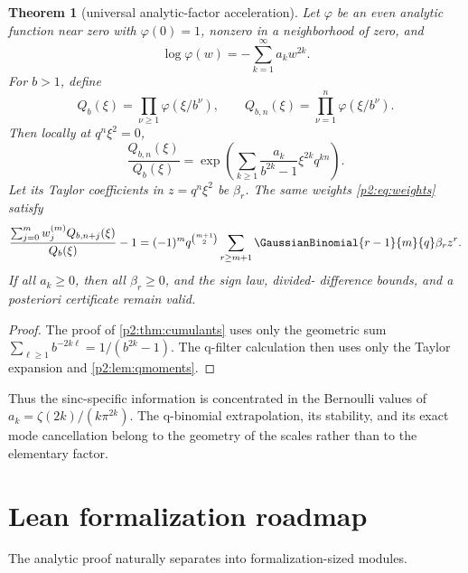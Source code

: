 \documentclass[11pt,oneside]{article}
\numberwithin{equation}{section}
\newtheorem{theorem}{Theorem}[section]
\theoremstyle{definition}
\theoremstyle{remark}
\begin{document}
\begin{theorem}[universal analytic-factor acceleration]
\label{p2:thm:universal}
Let \(\varphi\) be an even analytic function near zero with \(\varphi(0)=1\),
nonzero in a neighborhood of zero, and
\begin{equation}
 \log\varphi(w)=-\sum_{k=1}^{\infty}a_kw^{2k}.
 \label{p2:eq:generalphi}
\end{equation}
For \(b>1\), define
\[
 Q_b(\xi)=\prod_{\nu\geq1}\varphi(\xi/b^\nu),
 \qquad Q_{b,n}(\xi)=\prod_{\nu=1}^n\varphi(\xi/b^\nu).
\]
Then locally at \(q^n\xi^2=0\),
\begin{equation}
 \frac{Q_{b,n}(\xi)}{Q_b(\xi)}
 =\exp\!\left(\sum_{k\geq1}
 \frac{a_k}{b^{2k}-1}\xi^{2k}q^{kn}\right).
 \label{p2:eq:universalTail}
\end{equation}
Let its Taylor coefficients in \(z=q^n\xi^2\) be \(\beta_r\). The same weights
\eqref{p2:eq:weights} satisfy
\begin{equation}
 \frac{\sum_{j=0}^mw_j^{(m)}Q_{b,n+j}(\xi)}{Q_b(\xi)}-1
 =(-1)^mq^{\binom{m+1}{2}}
 \sum_{r\geq m+1}\GaussianBinomial{r-1}{m}{q}\beta_r z^r.
 \label{p2:eq:universalError}
\end{equation}
If all \(a_k\geq0\), then all \(\beta_r\geq0\), and the sign law, divided-
difference bounds, and a posteriori certificate remain valid.
\end{theorem}

\begin{proof}
The proof of \cref{p2:thm:cumulants} uses only the geometric sum
\(\sum_{\ell\geq1}b^{-2k\ell}=1/(b^{2k}-1)\). The q-filter calculation then
uses only the Taylor expansion and \cref{p2:lem:qmoments}.
\end{proof}

Thus the sinc-specific information is concentrated in the Bernoulli values of
\(a_k=\zeta(2k)/(k\pi^{2k})\). The q-binomial extrapolation, its stability, and
its exact mode cancellation belong to the geometry of the scales rather than to
the elementary factor.

\section{Lean formalization roadmap}
\label{p2:sec:lean}

The analytic proof naturally separates into formalization-sized modules.
\end{document}
